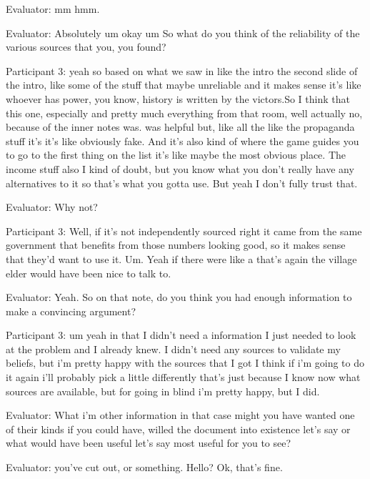 \documentclass{l4proj}
\begin{document}
\begin{appendices}
Evaluator: mm hmm.

Evaluator: Absolutely um okay um So what do you think of the reliability of the various sources that you, you found?

Participant 3: yeah so based on what we saw in like the intro the second slide of the intro, like some of the stuff that maybe unreliable and it makes sense it's like whoever has power, you know, history is written by the victors.So I think that this one, especially and pretty much everything from that room, well actually no, because of the inner notes was. was helpful but, like all the like the propaganda stuff it's it's like obviously fake. And it's also kind of where the game guides you to go to the first thing on the list it's like maybe the most obvious place. The income stuff also I kind of doubt, but you know what you don't really have any alternatives to it so that's what you gotta use. But yeah I don't fully trust that.

Evaluator: Why not?
	
Participant 3: Well, if it's not independently sourced right it came from the same government that benefits from those numbers looking good, so it makes sense that they'd want to use it. Um. Yeah if there were like a that's again the village elder would have been nice to talk to.

Evaluator: Yeah. So on that note, do you think you had enough information to make a convincing argument?

Participant 3: um yeah in that I didn't need a information I just needed to look at the problem and I already knew. I didn't need any sources to validate my beliefs, but i'm pretty happy with the sources that I got I think if i'm going to do it again i'll probably pick a little differently that’s just because I know now what sources are available, but for going in blind i'm pretty happy, but I did.

Evaluator: What i'm other information in that case might you have wanted one of their kinds if you could have, willed the document into existence let's say or what would have been useful let's say most useful for you to see?

Evaluator: you've cut out, or something. Hello? Ok, that’s fine. 


\end{appendices}
\end{document}
